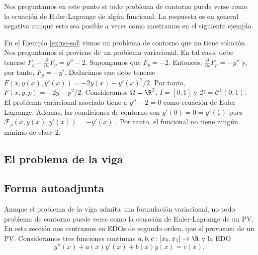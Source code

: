 \documentclass{article}
\begin{document}
Nos preguntamos en este punto si todo problema de contorno puede verse como la ecuación de
Euler-Lagrange de algún funcional. La respuesta es en general negativa aunque esto sea posible a
veces como mostramos en el siguiente ejemplo.

\begin{ex}
  En el Ejemplo \ref{ex:no-sol} vimos un problema de contorno que no tiene solución. Nos preguntamos
  si proviene de un problema variacional. En tal caso, debe tenerse
  $F_y - \frac{\partial}{\partial x} F_p = y''-2$. Supongamos que $F_y = -2$. Entonces,
  $\frac{\partial}{\partial x} F_p = -y''$ y, por tanto, $F_p = -y'$. Deducimos que debe tenerse
  $F(x,y(x),y'(x)) = -2y(x) - y'(x)^2/2$. Por tanto, $F(x,y,p) = -2y -p^2/2$. Consideramos
  $\Omega = \R^2$, $I = [0,1]$ y $\mathcal{D} = \mathcal{C}^1(0, 1)$. El problema variacional
  asociado tiene a $y'' -2 = 0$ como ecuación de Euler-Lagrange. Además, las condiciones de contorno
  son $y'(0) = 0 = y'(1)$ pues $\mathcal{F}_p(x,y(x),y'(x)) = -y'(x)$ . Por tanto, el funcional no
  tiene ningún mínimo de clase $2$.
\end{ex}


\subsection{El problema de la viga}

\begin{ex}
  
\end{ex}

\begin{ex}
  
\end{ex}

\subsection{Forma autoadjunta}

Aunque el problema de la viga admita una formulación variacional, no todo problema de contorno puede
verse como la ecuación de Euler-Lagrange de un PV. En esta sección nos centramos en EDOs de segundo
orden, que sí provienen de un PV. Consideramos tres funciones continuas
$a, b, c : [x_0, x_1] \to \R$ y la EDO
\begin{equation} \label{eq:edo:2} y''(x) + a(x) y'(x) + b(x)y(x) = c(x).
\end{equation}
\end{document}
